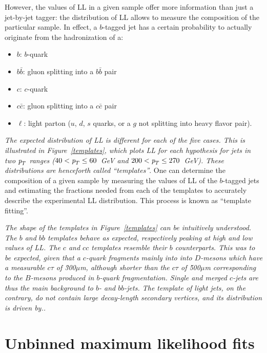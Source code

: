 However, the values of LL in a given sample offer more information than just a jet-by-jet tagger: the distribution of LL allows to measure the composition of the particular sample. In effect, a $b$-tagged jet has a certain probability to actually originate from the hadronization of a:

\begin{itemize}
\item
$b$: $b$-quark
\item
$b\bar{b}$: gluon splitting into a $b\bar{b}$ pair
\item
$c$: $c$-quark
\item
$c\bar{c}$: gluon splitting into a $c\bar{c}$ pair
\item
$\ell$: light parton ($u$, $d$, $s$ quarks, or a $g$ not splitting into heavy flavor pair).
\end{itemize}

\emph{The expected distribution of LL is different for each of the five cases. This is illustrated in Figure~\ref{templates}, which plots LL for each hypothesis for jets in two ${\emph{p}_{T}}$ ranges ($40<{\emph{p}_{T}}\leq60$~GeV and $200<{\emph{p}_{T}}\leq270$~GeV). These distributions are henceforth called ``templates''}. One can determine the composition of a given sample by measuring the values of LL of the $b$-tagged jets and estimating the fractions needed from each of the templates to accurately describe the experimental LL distribution. This process is known as ``template fitting''.

\emph{The shape of the templates in Figure~\ref{templates} can be intuitively understood. The $b$ and $bb$ templates behave as expected, respectively peaking at high and low values of LL. The $c$ and $cc$ templates resemble their $b$ counterparts. This was to be expected, given that a $c$-quark fragments mainly into into $D$-mesons which have a measurable $c\tau$ of \~300$\mu$m, although shorter than the  $c\tau$ of \~500$\mu$m corresponding to the $B$-mesons produced in $b$-quark fragmentation. Single and merged $c$-jets are thus the main background to $b$- and $bb$-jets. The template of light jets, on the contrary, do not contain large decay-length secondary vertices, and its distribution is driven by..}



\section{Unbinned maximum likelihood fits}\label{sec:LLFits}

